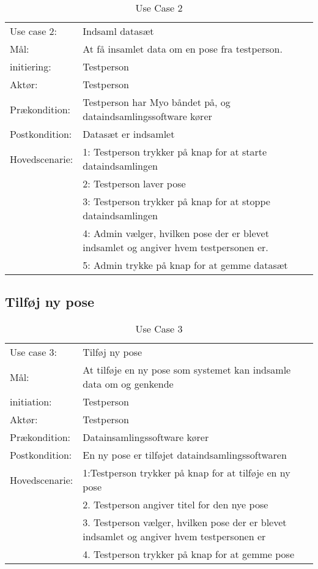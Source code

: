 \begin{center}
	\begin{table}[htbp]
		\begin{tabular}{lp{10cm}}
			\rowcolor{grey} Use case 2:		& Indsaml datasæt \\
			Mål: 	& At få insamlet data om en pose fra testperson. \\
			initiering:	& Testperson\\
			Aktør: & Testperson\\
			Prækondition: & Testperson har Myo båndet på, og dataindsamlingssoftware kører\\
			Postkondition: & Datasæt er indsamlet\\
			Hovedscenarie: & 1: Testperson trykker på knap for at starte dataindsamlingen\\
			& 2: Testperson laver pose\\
			& 3: Testperson trykker på knap for at stoppe dataindsamlingen\\
			& 4: Admin vælger, hvilken pose der er blevet indsamlet og angiver hvem testpersonen er.\\
			& 5: Admin trykke på knap for at gemme datasæt\\
		\end{tabular}
		\caption{Use Case 2}
	\end{table}
\end{center}

\subsection{Tilføj ny pose}
\begin{center}
	\begin{table}[htbp]
		\begin{tabular}{lp{10cm}}
			\rowcolor{grey} Use case 3:		& Tilføj ny pose\\
			Mål: 	& At tilføje en ny pose som systemet kan indsamle data om og genkende \\
			initiation:	& Testperson\\
			Aktør: & Testperson\\
			Prækondition: & Datainsamlingssoftware kører \\
			Postkondition: & En ny pose er tilføjet dataindsamlingssoftwaren\\
			Hovedscenarie: & 1:Testperson trykker på knap for at tilføje en ny pose\\
			& 2. Testperson angiver titel for den nye pose\\
			& 3. Testperson vælger, hvilken pose der er blevet indsamlet og angiver hvem testpersonen er\\
			& 4. Testperson trykker på knap for at gemme pose\\
		\end{tabular}
		\caption{Use Case 3}
	\end{table}
\end{center}

